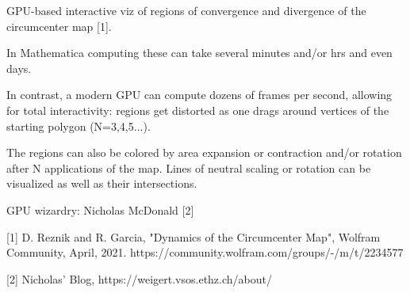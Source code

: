 GPU-based interactive viz of regions of convergence and divergence of the circumcenter map [1]. 

In Mathematica computing these can take several minutes and/or hrs and even days.

In contrast, a modern GPU can compute dozens of frames per second, allowing for total interactivity: regions get distorted as one drags around vertices of the starting polygon (N=3,4,5...).

The regions can also be colored by area expansion or contraction and/or rotation after N applications of the map. Lines of neutral scaling or rotation can be visualized as well as their intersections.

GPU wizardry: Nicholas McDonald [2]

 [1] D. Reznik and R. Garcia, "Dynamics of the Circumcenter Map", Wolfram Community, April, 2021. https://community.wolfram.com/groups/-/m/t/2234577

[2] Nicholas' Blog, https://weigert.vsos.ethz.ch/about/